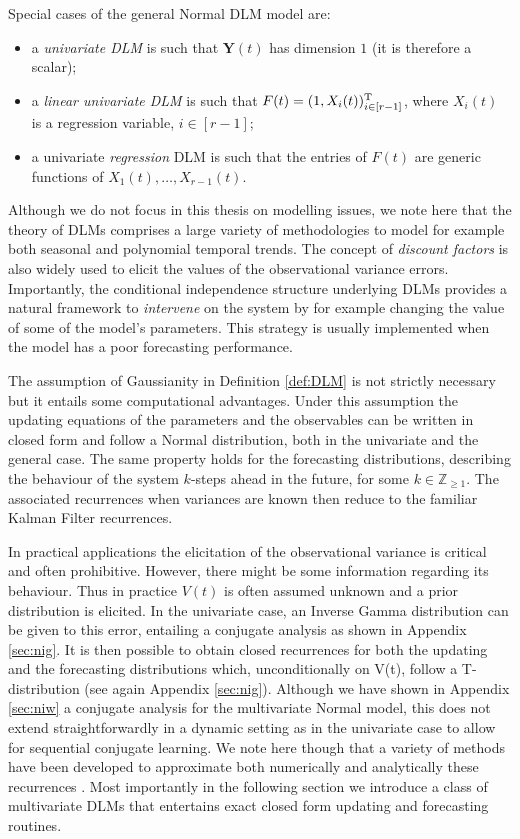 \begin{example}
Special cases of the general Normal DLM model are:
\begin{itemize}
\item a \textit{univariate DLM} is such that $\bm{Y}(t)$ has dimension $1$ (it is therefore a scalar);
\item a \textit{linear univariate DLM} is such that $F(t)=(1,X_{i}(t))_{i\in[r-1]}^{\textnormal{T}}$, where $X_{i}(t)$ is a regression variable, $i\in [r-1]$;
\item a univariate \textit{regression} DLM is such that the entries of $F(t)$ are generic functions of $X_{1}(t),\dots,X_{r-1}(t)$. 
\end{itemize}
\end{example}

Although we do not focus in this thesis on modelling issues, we note here that the theory of DLMs comprises a large variety of methodologies to model for example both seasonal and polynomial temporal trends. The concept of \textit{discount factors} is also widely used to elicit the values of the observational variance errors. Importantly, the conditional independence structure underlying DLMs provides a natural framework to \textit{intervene} on the system by for example changing the value of some of the model's parameters. This strategy is usually implemented when the model has a poor forecasting performance.

The assumption of Gaussianity in Definition \ref{def:DLM} is not strictly necessary but it entails some computational advantages. Under this assumption the updating equations of the parameters and the observables can be written in closed form and follow a Normal distribution, both in the univariate and the general case. The same property holds for the forecasting distributions, describing the behaviour of the system $k$-steps ahead in the future, for some $k\in\mathbb{Z}_{\geq 1}$. The associated recurrences when variances are known then reduce to the familiar Kalman Filter recurrences.

In practical applications the elicitation of the observational variance is critical and often prohibitive. However, there might be some information regarding its behaviour. Thus in practice $V(t)$ is often assumed unknown and a prior distribution is elicited. In the univariate case, an Inverse Gamma distribution can be given to this error, entailing a conjugate analysis as shown in Appendix \ref{sec:nig}. It is then possible to obtain closed recurrences for both the updating and the forecasting distributions which, unconditionally on V(t), follow a T-distribution (see again Appendix \ref{sec:nig}). Although we have shown in Appendix \ref{sec:niw} a conjugate analysis for the multivariate Normal model, this does not extend straightforwardly in a dynamic setting as in the univariate case to allow for sequential conjugate learning. We note here though that a variety of methods have been developed to approximate both numerically and analytically these recurrences \citep[see][]{West1997}. Most importantly in the following section we introduce a class of multivariate DLMs that entertains exact closed form updating and forecasting routines. 
  
